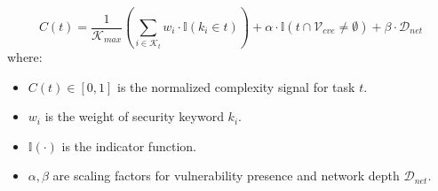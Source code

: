 \begin{equation}
\label{eq:complexity}
C(t) = \frac{1}{\mathcal{K}_{max}} \left( \sum_{i \in \mathcal{K}_t} w_i \cdot \mathbb{I}(k_i \in t) \right) + \alpha \cdot \mathbb{I}(t \cap \mathcal{V}_{cve} \neq \emptyset) + \beta \cdot \mathcal{D}_{net}
\end{equation}
where:
\begin{itemize}
    \item $C(t) \in [0, 1]$ is the normalized complexity signal for task $t$.
    \item $w_i$ is the weight of security keyword $k_i$.
    \item $\mathbb{I}(\cdot)$ is the indicator function.
    \item $\alpha, \beta$ are scaling factors for vulnerability presence and network depth $\mathcal{D}_{net}$.
\end{itemize}
